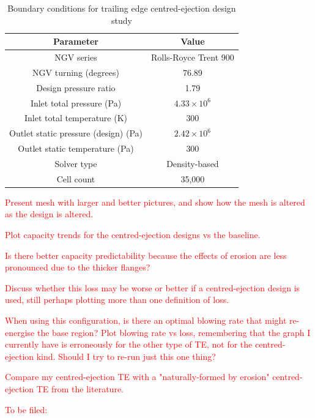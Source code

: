 \documentclass[a4paper, 11pt, oneside]{report}
\begin{document}
\begin{table}[H]
\caption{Boundary conditions for trailing edge centred-ejection design study}
\label{ps_cutbacks_parameters}
\begin{center}
\begin{tabular}{|c|c|}
\hline
Parameter & Value\\
\hline
NGV series & Rolls-Royce Trent 900\\
NGV turning (degrees) & 76.89\\
Design pressure ratio & 1.79\\
Inlet total pressure (Pa) & $4.33 \times 10^6$\\
Inlet total temperature (K) & 300\\
Outlet static pressure (design) (Pa) & $2.42 \times 10^6$\\
Outlet static temperature (Pa) & 300\\
Solver type & Density-based\\
Cell count & 35,000\\
\hline
\end{tabular}
\end{center}
\end{table}

\textcolor{red}{Present mesh with larger and better pictures, and show how the mesh is altered as the design is altered.}

\textcolor{red}{Plot capacity trends for the centred-ejection designs vs the baseline.}

\textcolor{red}{Is there better capacity predictability because the effects of erosion are less pronounced due to the thicker flanges?}

\textcolor{red}{Discuss whether this loss may be worse or better if a centred-ejection design is used, still perhaps plotting more than one definition of loss.}

\textcolor{red}{When using this configuration, is there an optimal blowing rate that might re-energise the base region? Plot blowing rate vs loss, remembering that the graph I currently have is erroneously for the other type of TE, not for the centred-ejection kind. Should I try to re-run just this one thing?}

\textcolor{red}{Compare my centred-ejection TE with a "naturally-formed by erosion" centred-ejection TE from the literature.} 

\textcolor{red}{To be filed:}
\end{document}
